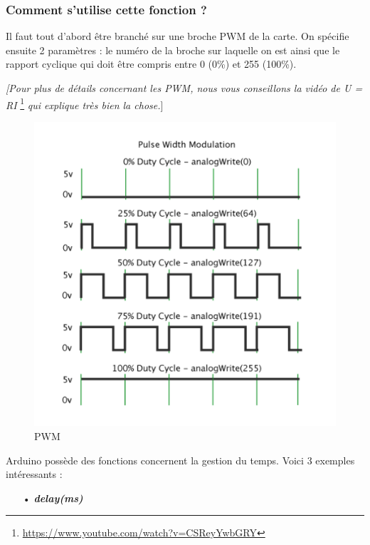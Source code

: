 \documentclass[12pt,a4paper]{article}
\begin{document}
\subsubsection*{Comment s’utilise cette fonction ?}

Il faut tout d’abord être branché sur une broche PWM de la carte. On spécifie ensuite 2 paramètres : le numéro de la broche sur laquelle on est ainsi que le rapport cyclique qui doit être compris entre 0 (0\%) et 255 (100\%). 

\bigskip

\textit{[Pour plus de détails concernant les PWM, nous vous conseillons la vidéo de U = RI} \footnote{\url{https://www.youtube.com/watch?v=CSReyYwbGRY}} \textit{qui explique très bien la chose.}]


\begin{figure}[h!]
    \centering
    \includegraphics[scale=0.8]{pwm2.PNG}
    \caption{PWM}
    \label{fig:my_label}
\end{figure}


\newpage
Arduino possède des fonctions  concernent la gestion du temps. Voici 3 exemples intéressants : 

\bigskip
\begin{itemize}
    \item[•] \textit{\textbf{delay(ms)}}
\end{itemize}
\end{document}
